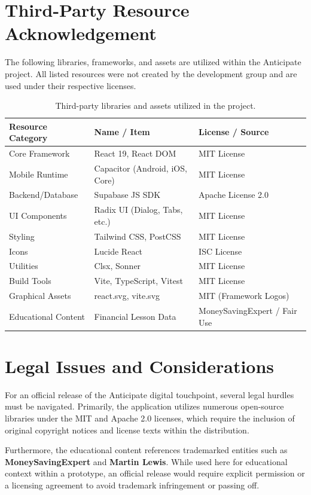 \documentclass[11pt,a4paper]{article}
\begin{document}
\section{Third-Party Resource Acknowledgement}
The following libraries, frameworks, and assets are utilized within the Anticipate project. All listed resources were not created by the development group and are used under their respective licenses.

\begin{table}[h]
\centering
\small
\begin{tabular}{lll}
\toprule
\textbf{Resource Category} & \textbf{Name / Item} & \textbf{License / Source} \\
\midrule
Core Framework & React 19, React DOM & MIT License \\
Mobile Runtime & Capacitor (Android, iOS, Core) & MIT License \\
Backend/Database & Supabase JS SDK & Apache License 2.0 \\
UI Components & Radix UI (Dialog, Tabs, etc.) & MIT License \\
Styling & Tailwind CSS, PostCSS & MIT License \\
Icons & Lucide React & ISC License \\
Utilities & Clsx, Sonner & MIT License \\
Build Tools & Vite, TypeScript, Vitest & MIT License \\
Graphical Assets & react.svg, vite.svg & MIT (Framework Logos) \\
Educational Content & Financial Lesson Data & MoneySavingExpert / Fair Use \\
\bottomrule
\end{tabular}
\caption{Third-party libraries and assets utilized in the project.}
\end{table}

\section{Legal Issues and Considerations}
For an official release of the Anticipate digital touchpoint, several legal hurdles must be navigated. Primarily, the application utilizes numerous open-source libraries under the MIT and Apache 2.0 licenses, which require the inclusion of original copyright notices and license texts within the distribution. 

Furthermore, the educational content references trademarked entities such as \textbf{MoneySavingExpert} and \textbf{Martin Lewis}. While used here for educational context within a prototype, an official release would require explicit permission or a licensing agreement to avoid trademark infringement or passing off. 
\end{document}
